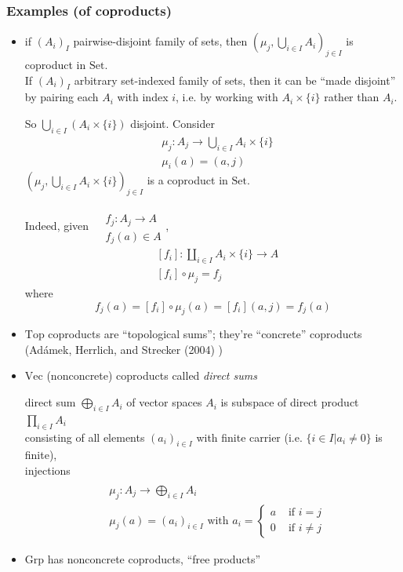 \subsubsection{Examples (of coproducts)} 

\begin{itemize}
	\item if $(A_i)_I$ pairwise-disjoint family of sets, then $(\mu_j, \bigcup_{i\in I} A_i)_{j\in I}$ is coproduct in $\text{Set}$.  \\
	If $(A_i)_I$ arbitrary set-indexed family of sets, then it can be ``made disjoint'' by pairing each $A_i$ with index $i$, i.e. by working with $A_i \times \lbrace i \rbrace$ rather than $A_i$.  
	
	So $\bigcup_{i\in I } (A_i \times \lbrace i \rbrace)$ disjoint.  Consider 
	\[
	\begin{aligned}
	&  \mu_j : A_j \to \bigcup_{i \in I} A_i \times \lbrace i \rbrace \\ 
	&  \mu_i(a) = (a,j)
	\end{aligned}
	\]
	$(\mu_j, \bigcup_{i\in I} A_i \times \lbrace i \rbrace )_{j\in I}$ is a coproduct in $\text{Set}$.  
	
	Indeed, given $\begin{aligned} & \quad \\
	& f_j:A_j \to A \\
	& f_j(a) \in A \end{aligned}$, 
	\[
	\begin{aligned}
	& [f_i] : \coprod_{i\in I} A_i \times \lbrace i \rbrace \to A \\ 
	& [f_i]\circ \mu_j = f_j 
	\end{aligned}
	\]
	where
	\[
	f_j(a) = [f_i]\circ \mu_j(a) = [f_i](a,j) = f_j(a)
	\]
	\item  $\text{Top}$ coproducts are ``topological sums''; they're ``concrete'' coproducts (Ad\'{a}mek, Herrlich, and Strecker (2004) \cite{agat:AHS2004})
	\item $\text{Vec}$ (nonconcrete) coproducts called \emph{direct sums}
	
	direct sum $\bigoplus_{i\in I} A_i$ of vector spaces $A_i$ is subspace of direct product $\prod_{i\in I} A_i$ \\
	consisting of all elements $(a_i)_{i\in I}$ with finite carrier (i.e. $\lbrace i \in I | a_i \neq 0 \rbrace$ is finite), \\
	\qquad injections \[
	\begin{aligned} & \quad \\
	& \mu_j : A_j \to \bigoplus_{i\in I } A_i  \\
	& \mu_j(a) = (a_i)_{i\in I} \text { with } a_i = \begin{cases} a & \text{ if } i = j  \\ 0 & \text{ if } i \neq j \end{cases}
	\end{aligned}
	\]
	
	\item $\text{Grp}$ has nonconcrete coproducts, ``free products''
\end{itemize}

